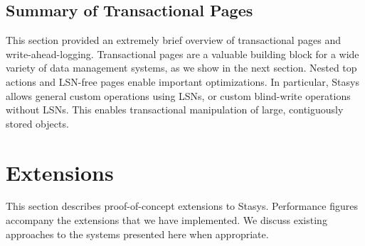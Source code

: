 \documentclass[letterpaper,twocolumn,10pt]{article}
\newcommand{\yad}{Stasys\xspace}
\newcommand{\eat}[1]{}
\begin{document}
\subsection{Summary of Transactional Pages}

This section provided an extremely brief overview of transactional
pages and write-ahead-logging.  Transactional pages are a valuable
building block for a wide variety of data management systems, as we
show in the next section.  Nested top actions and LSN-free pages
enable important optimizations.  In particular, \yad allows general 
custom operations using LSNs, or custom blind-write operations
without LSNs.  This enables transactional manipulation of large, 
contiguously stored objects.

\eat{
Although the extensions that it proposes
require a fair amount of knowledge about transactional logging
schemes, our initial experience customizing the system for various
applications is positive.  We believe that the time spent customizing
the library is less than amount of time that it would take to work
around typical problems with existing transactional storage systems.

}



\section{Extensions}
\label{sec:extensions}
This section describes proof-of-concept extensions to \yad.
Performance figures accompany the extensions that we have implemented.
We discuss existing approaches to the systems presented here when
appropriate.
\end{document}
